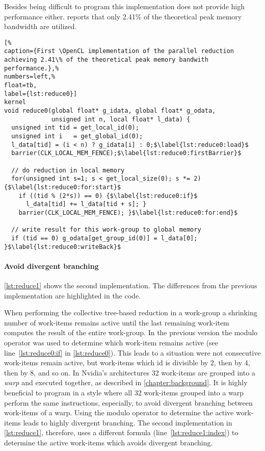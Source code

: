 Besides being difficult to program this implementation does not provide high performance either.
\citeauthor{Harris2007} reports that only 2.41\% of the theoretical peak memory bandwidth are utilized. 

\begin{lstlisting}[%                                                             
caption={First \OpenCL implementation of the parallel reduction achieving 2.41\% of the theoretical peak memory bandwith performance.},%
numbers=left,%
float=tb,
label={lst:reduce0}]
kernel
void reduce0(global float* g_idata, global float* g_odata,
             unsigned int n, local float* l_data) {
  unsigned int tid = get_local_id(0);
  unsigned int i   = get_global_id(0);
  l_data[tid] = (i < n) ? g_idata[i] : 0;$\label{lst:reduce0:load}$
  barrier(CLK_LOCAL_MEM_FENCE);$\label{lst:reduce0:firstBarrier}$

  // do reduction in local memory
  for(unsigned int s=1; s < get_local_size(0); s *= 2) {$\label{lst:reduce0:for:start}$
    if ((tid % (2*s)) == 0) {$\label{lst:reduce0:if}$
      l_data[tid] += l_data[tid + s]; }
    barrier(CLK_LOCAL_MEM_FENCE); }$\label{lst:reduce0:for:end}$

  // write result for this work-group to global memory
  if (tid == 0) g_odata[get_group_id(0)] = l_data[0]; }$\label{lst:reduce0:writeBack}$
\end{lstlisting}

\FloatBarrier
\newpage

\paragraph{Avoid divergent branching}

\autoref{lst:reduce1} shows the second implementation.
The differences from the previous implementation are highlighted in the code.

When performing the collective tree-based reduction in a work-group a shrinking number of work-items remains active until the last remaining work-item computes the result of the entire work-group.
In the previous version the modulo operator was used to determine which work-item remains active (see line~\ref{lst:reduce0:if} in \autoref{lst:reduce0}).
This leads to a situation were not consecutive work-items remain active, but work-items which id is divisible by 2, then by 4, then by 8, and so on.
In Nvidia's \GPU architectures 32 work-items are grouped into a \emph{warp} and executed together, as described in \autoref{chapter:background}.
It is highly beneficial to program in a style where all 32 work-items grouped into a warp perform the same instructions, especially, to avoid divergent branching between work-items of a warp.
Using the modulo operator to determine the active work-items leads to highly divergent branching.
The second implementation in \autoref{lst:reduce1}, therefore, uses a different formula (line~\ref{lst:reduce1:index}) to determine the active work-items which avoids divergent branching.

